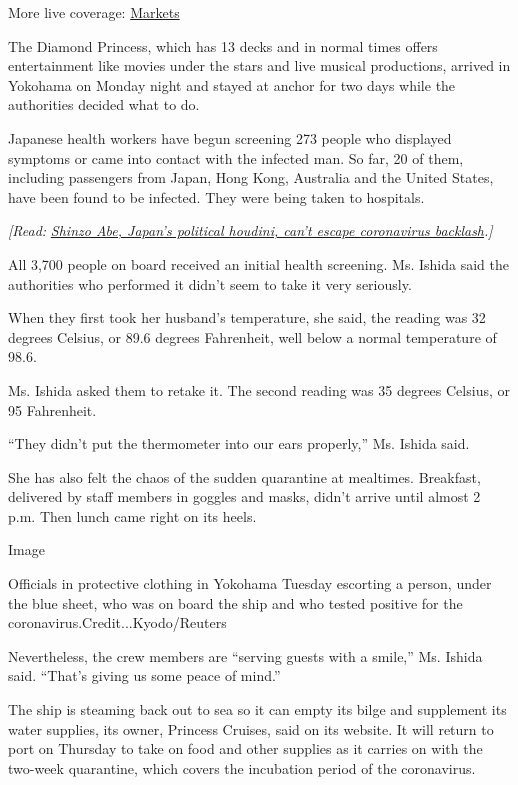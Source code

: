 More live coverage:
\href{https://www.nytimes3xbfgragh.onion/live/2020/08/21/business/stock-market-today-coronavirus?action=click\&pgtype=Article\&state=default\&region=MAIN_CONTENT_1\&context=storylines_live_updates}{Markets}

The Diamond Princess, which has 13 decks and in normal times offers
entertainment like movies under the stars and live musical productions,
arrived in Yokohama on Monday night and stayed at anchor for two days
while the authorities decided what to do.

Japanese health workers have begun screening 273 people who displayed
symptoms or came into contact with the infected man. So far, 20 of them,
including passengers from Japan, Hong Kong, Australia and the United
States, have been found to be infected. They were being taken to
hospitals.

\emph{{[}Read:}
\href{http://www.nytimes3xbfgragh.onion/2020/03/05/world/asia/japan-abe-coronavirus.html}{\emph{Shinzo
Abe, Japan's political houdini, can't escape coronavirus
backlash}}\emph{.{]}}

All 3,700 people on board received an initial health screening. Ms.
Ishida said the authorities who performed it didn't seem to take it very
seriously.

When they first took her husband's temperature, she said, the reading
was 32 degrees Celsius, or 89.6 degrees Fahrenheit, well below a normal
temperature of 98.6.

Ms. Ishida asked them to retake it. The second reading was 35 degrees
Celsius, or 95 Fahrenheit.

``They didn't put the thermometer into our ears properly,'' Ms. Ishida
said.

She has also felt the chaos of the sudden quarantine at mealtimes.
Breakfast, delivered by staff members in goggles and masks, didn't
arrive until almost 2 p.m. Then lunch came right on its heels.

Image

Officials in protective clothing in Yokohama Tuesday escorting a person,
under the blue sheet, who was on board the ship and who tested positive
for the coronavirus.Credit...Kyodo/Reuters

Nevertheless, the crew members are ``serving guests with a smile,'' Ms.
Ishida said. ``That's giving us some peace of mind.''

The ship is steaming back out to sea so it can empty its bilge and
supplement its water supplies, its owner, Princess Cruises, said on its
website. It will return to port on Thursday to take on food and other
supplies as it carries on with the two-week quarantine, which covers the
incubation period of the coronavirus.

